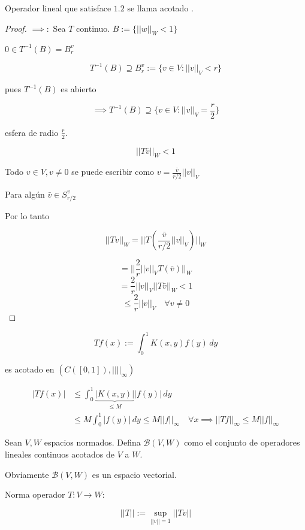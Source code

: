 \documentclass[../Apunte.tex]{subfiles}
\begin{document}
\begin{fdefinition}
    Operador lineal que satisface $1.2$ se llama \color{red} acotado \color{black}.
\end{fdefinition}

\begin{proof}
    $\implies:$ Sea $T$ continuo. $B:=\{||w||_W<1\}$

    $0\in T^{-1}(B)=B_r^v$

    \[T^{-1}(B)\supseteq B_r^v:=\{v\in V:||v||_V<r\}\]

    pues $T^{-1}(B)$ es abierto 

    \[\implies T^{-1}(B)\supseteq \{v\in V:||v||_V=\frac{r}{2}\}\]

    esfera de radio $\frac{r}{2}$.

    \[||T\bar v||_W<1\]

    Todo $v\in V,v\neq 0$ se puede escribir como $v=\frac{\bar v}{r/2}||v||_V$

    Para algún $\bar v\in S_{r/2}^v$

    Por lo tanto

    \[||Tv||_W=||T(\frac{\bar v }{r/2}||v||_V)||_W\]

    \[=||\frac{2}{r}||v||_V T(\bar v)||_W\]
    \[=\frac{2}{r}||v||_V ||T\bar v||_W<1\]
    \[\leq \frac{2}{r}||v||_V\quad \forall v\neq 0\]
\end{proof}

\begin{fexample}
    \[Tf(x):=\int_0^1 K(x,y)f(y)\,dy\]

    es acotado en $(C([0,1]),||||_\infty )$

    \begin{align*}|Tf(x)|&\leq \int_0^1 \underbrace{|K(x,y)|}_{\leq M}|f(y)|\,dy\\
    &\leq M\int_0^1 |f(y)|\,dy\leq M ||f||_\infty\quad \forall x\implies ||Tf||_\infty \leq M||f||_\infty\end{align*}
\end{fexample}

\begin{fdefinition}
    Sean $V,W$ espacios normados. Defina $\mathcal{B}(V,W)$ como el conjunto de operadores lineales continuos acotados de $V$ a $W$.

    Obviamente $\mathcal{B}(V,W)$ es un espacio vectorial.
\end{fdefinition}

Norma operador $T:V\to W$:

\[||T||:=\sup_{||v||=1} ||Tv||\]
\end{document}
